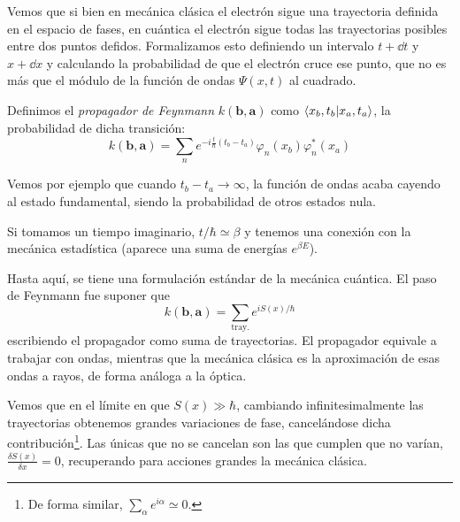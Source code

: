 \documentclass[a4paper,11pt]{tufte-book}
\begin{document}
Vemos que si bien en mecánica clásica el electrón sigue una
trayectoria definida en el espacio de fases, en cuántica el electrón
sigue todas las trayectorias posibles entre dos puntos defidos.
Formalizamos esto definiendo un intervalo $t+\dd{t}$ y $x+\dd{x}$ y
calculando la probabilidad de que el electrón cruce ese punto, que no
es más que el módulo de la función de ondas $Ψ(x,t)$ al cuadrado.

Definimos el \emph{propagador de Feynmann} $k(\mathbf{b},\mathbf{a})$
como $\bra{x_b,t_b}\ket{x_a,t_a}$, la probabilidad de dicha
transición:
\begin{equation}
  k(\mathbf{b},\mathbf{a}) = \sum_{n} e^{-i \frac{t}{ℏ}(t_b-t_a)} φ_n(x_b)φ^*_n(x_a)
\end{equation}

Vemos por ejemplo que cuando $t_b-t_a \to \infty$, la función de ondas
acaba cayendo al estado fundamental, siendo la probabilidad de otros
estados nula.

Si tomamos un tiempo imaginario, $t/ℏ\simeq β$ y tenemos una conexión
con la mecánica estadística (aparece una suma de energías $e^{βE}$).

Hasta aquí, se tiene una formulación estándar de la mecánica cuántica.
El paso de Feynmann fue suponer que
\begin{equation}
  k(\mathbf{b},\mathbf{a}) = \sum_{\text{tray.}} e^{i S(x)/ ℏ}
\end{equation}
escribiendo el propagador como suma de trayectorias. El propagador
equivale a trabajar con ondas, mientras que la mecánica clásica es la
aproximación de esas ondas a rayos, de forma análoga a la óptica.

Vemos que en el límite en que $S(x)\gg ℏ$, cambiando
infinitesimalmente las trayectorias obtenemos grandes variaciones de
fase, cancelándose dicha contribución\footnote{De forma similar,
  $\sum_{α} e^{iα} \simeq 0$.}. Las únicas que no se cancelan
son las que cumplen que no varían, $ \frac{δS(x)}{δx}=0$, recuperando
para acciones grandes la mecánica clásica.
\end{document}

